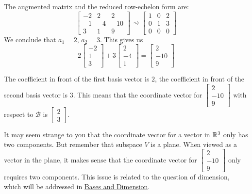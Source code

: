 \documentclass{ximera}
\begin{document}
\begin{example}
\begin{explanation}
 The augmented matrix and the reduced row-echelon form are:
 $$\left[\begin{array}{cc|c}  
 -2&2&2\\-1&-4&-10\\3&1&9
 \end{array}\right]\rightsquigarrow\left[\begin{array}{cc|c}  
 1&0&2\\0&1&3\\0&0&0
 \end{array}\right]$$
 We conclude that $a_1=2$, $a_2=3$.  This gives us
 $$2\begin{bmatrix}-2\\1\\3\end{bmatrix}+3\begin{bmatrix}2\\-4\\1\end{bmatrix}=\begin{bmatrix}2\\-10\\9\end{bmatrix}$$
 
 The coefficient in front of the first basis vector is $2$, the coefficient in front of the second basis vector is $3$.  This means that the coordinate vector for $\begin{bmatrix}2\\-10\\9\end{bmatrix}$ with respect to $\mathcal{B}$ is $\begin{bmatrix}2\\3\end{bmatrix}$.
 
 \begin{remark}
 It may seem strange to you that the coordinate vector for a vector in $\mathbb{R}^3$ only has two components.  But remember that subspace $V$ is a plane.  When viewed as a vector in the plane, it  makes sense that the coordinate vector for $\begin{bmatrix}2\\-10\\9\end{bmatrix}$ only requires two components.  This issue is related to the question of dimension, which will be addressed in \href{https://ximera.osu.edu/linearalgebradzv3/LinearAlgebraInteractiveIntro/VSP-0035/main}{Bases and Dimension}.
 \end{remark}
 

\end{explanation}
\end{example}
\end{document}
